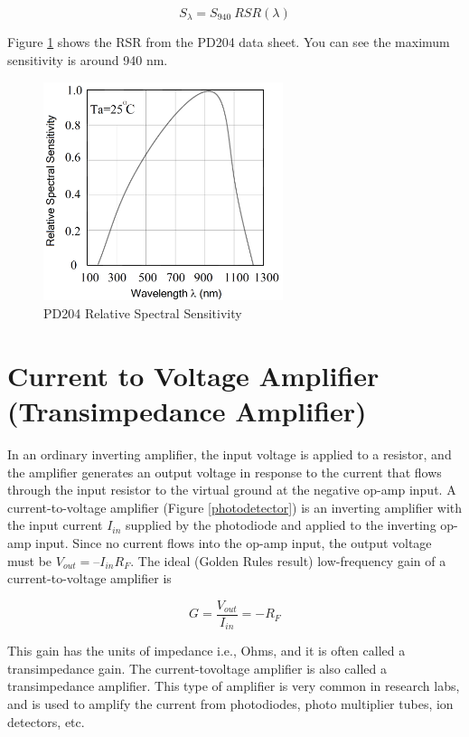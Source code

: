 \documentclass[10pt]{PhysLab1C} %
\begin{document}
$$S_{\lambda} = S_{940}~RSR(\lambda)$$

Figure \ref{pd204} shows the RSR from the PD204 data sheet. You can see the maximum sensitivity is around 940 nm.

\begin{figure}[h]
    \centering
    \includegraphics[width=7cm]{lab6fig/pd204-rss.png}
    \medskip
    \caption{PD204 Relative Spectral Sensitivity}
    \label{pd204}
\end{figure}

\section{Current to Voltage Amplifier (Transimpedance Amplifier)}

In an ordinary inverting amplifier, the input voltage is applied to a resistor, and the amplifier generates an output
voltage in response to the current that flows through the input resistor to the virtual ground at the negative op-amp input. A current-to-voltage amplifier (Figure \ref{photodetector}) is an inverting amplifier with the input current $I_{in}$ supplied by
the photodiode and applied to the inverting op-amp input. Since no current flows into the op-amp input, the
output voltage must be $V_{out} = –I_{in}R_F$. The ideal (Golden Rules result) low-frequency gain of a current-to-voltage
amplifier is

$$G=\frac{V_{out}}{I_{in}}=-R_F$$

This gain has the units of impedance i.e., Ohms, and it is often called a transimpedance gain. The current-tovoltage amplifier is also called a transimpedance amplifier. This type of amplifier is very common in research
labs, and is used to amplify the current from photodiodes, photo multiplier tubes, ion detectors, etc.
\end{document}
